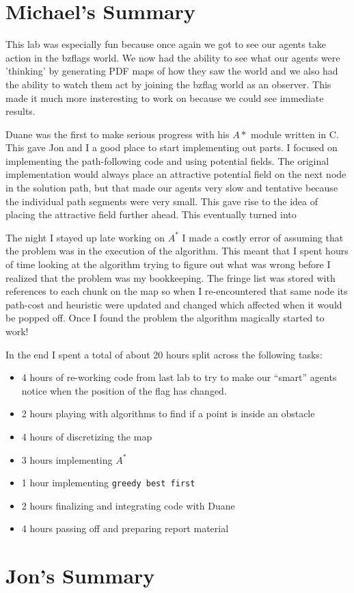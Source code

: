 \section{Michael's Summary}
This lab was especially fun because once again we got to see our agents take action in the bzflags world.  We now had the ability to see what our agents were 'thinking' by generating PDF maps of how they saw the world and we also had the ability to watch them act by joining the bzflag world as an observer.  This made it much more insteresting to work on because we could see immediate results.
\par
Duane was the first to make serious progress with his $A*$ module written in C.  This gave Jon and I a good place to start implementing out parts.  I focused on implementing the path-following code and using potential fields.  The original implementation would always place an attractive potential field on the next node in the solution path, but that made our agents very slow and tentative because the individual path segments were very small. This gave rise to the idea of placing the attractive field further ahead.  This eventually turned into 
\par
The night I stayed up late working on $A^*$ I made a costly error of assuming that the problem was in the execution of the algorithm.  This meant that I spent hours of time looking at the algorithm trying to figure out what was wrong before I realized that the problem was my bookkeeping.  The fringe list was stored with references to each chunk on the map so when I re-encountered that same node its path-cost and heuristic were updated and changed which affected when it would be popped off.  Once I found the problem the algorithm magically started to work!
\par
In the end I spent a total of about 20 hours split across the following tasks:
\begin{itemize}
    \item 4 hours of re-working code from last lab to try to make our ``smart'' agents notice when the position of the flag has changed.
    \item 2 hours playing with algorithms to find if a point is inside an obstacle
    \item 4 hours of discretizing the map
    \item 3 hours implementing $A^*$
    \item 1 hour implementing \texttt{greedy best first}
    \item 2 hours finalizing and integrating code with Duane
    \item 4 hours passing off and preparing report material
\end{itemize}

\section{Jon's Summary}